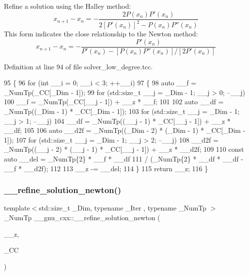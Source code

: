 Refine a solution using the Halley method\+: \[ x_{n+1} - x_n = -\frac{2 P(x_n) P'(x_n)} {2 [P'(x_n)]^2 - P(x_n) P''(x_n)} \] This form indicates the close relationship to the Newton method\+: \[ x_{n+1} - x_n = -\frac{P'(x_n)} {P'(x_n) - [P(x_n) P''(x_n)]/[2P'(x_n)]} \] 

Definition at line 94 of file solver\+\_\+low\+\_\+degree.\+tcc.


\begin{DoxyCode}
95     \{
96       \textcolor{keywordflow}{for} (\textcolor{keywordtype}{int} \_\_i = 0; \_\_i < 3; ++\_\_i)
97         \{
98           \textcolor{keyword}{auto} \_\_f = \_NumTp(\_CC[\_Dim - 1]);
99           \textcolor{keywordflow}{for} (std::size\_t \_\_j = \_Dim - 1; \_\_j > 0; --\_\_j)
100             \_\_f = \_NumTp(\_CC[\_\_j - 1]) + \_\_z * \_\_f;
101 
102           \textcolor{keyword}{auto} \_\_df = \_NumTp((\_Dim - 1) * \_CC[\_Dim - 1]);
103           \textcolor{keywordflow}{for} (std::size\_t \_\_j = \_Dim - 1; \_\_j > 1; --\_\_j)
104             \_\_df = \_NumTp((\_\_j - 1) * \_CC[\_\_j - 1]) + \_\_z * \_\_df;
105 
106           \textcolor{keyword}{auto} \_\_d2f = \_NumTp((\_Dim - 2) * (\_Dim - 1) * \_CC[\_Dim - 1]);
107           \textcolor{keywordflow}{for} (std::size\_t \_\_j = \_Dim - 1; \_\_j > 2; --\_\_j)
108             \_\_d2f = \_NumTp((\_\_j - 2) * (\_\_j - 1) * \_CC[\_\_j - 1]) + \_\_z * \_\_d2f;
109 
110           \textcolor{keyword}{const} \textcolor{keyword}{auto} \_\_del = \_NumTp\{2\} * \_\_f * \_\_df
111                            / (\_NumTp\{2\} * \_\_df * \_\_df - \_\_f * \_\_d2f);
112 
113           \_\_z -= \_\_del;
114         \}
115       \textcolor{keywordflow}{return} \_\_z;
116     \}
\end{DoxyCode}
\mbox{\label{namespace____gnu__cxx_a2b802e73df33cafb7f95800cbca6ff30}} 
\subsubsection{\texorpdfstring{\+\_\+\+\_\+refine\+\_\+solution\+\_\+newton()}{\_\_refine\_solution\_newton()}}
{\footnotesize\ttfamily template$<$std\+::size\+\_\+t \+\_\+\+Dim, typename \+\_\+\+Iter , typename \+\_\+\+Num\+Tp $>$ \\
\+\_\+\+Num\+Tp \+\_\+\+\_\+gnu\+\_\+cxx\+::\+\_\+\+\_\+refine\+\_\+solution\+\_\+newton (\begin{DoxyParamCaption}\item[{\+\_\+\+Num\+Tp}]{\+\_\+\+\_\+z,  }\item[{const \+\_\+\+Iter \&}]{\+\_\+\+CC }\end{DoxyParamCaption})}

